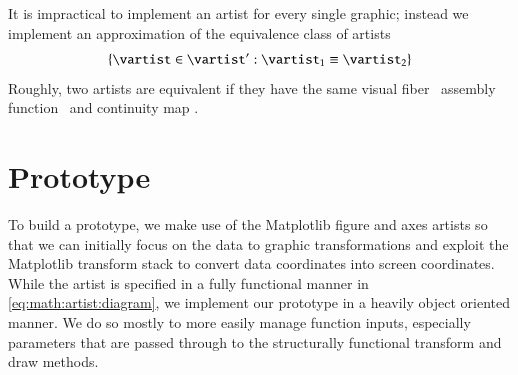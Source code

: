 \documentclass[journal]{vgtc}                %
\begin{document}
It is impractical to implement an artist for every single graphic; instead we implement an approximation of the equivalence class of artists 
\begin{equation}
\{\vartist \in \vartist^{\prime}: \vartist_{1} \equiv \vartist_{2}\}
\label{eq:math:artist:aprime}
\end{equation}
Roughly, two artists are equivalent if they have the same visual fiber \vfiber\, assembly function \vmark\, and continuity map \vindex. 

\section{Prototype}
\label{sec:code}
To build a prototype, we make use of the Matplotlib figure and axes artists \cite{hunterArchitectureOpenSource,hunterMatplotlib2DGraphics2007} so that we can initially focus on the data to graphic transformations and exploit the Matplotlib transform stack to convert data coordinates into screen coordinates. While the artist is specified in a fully functional manner in \autoref{eq:math:artist:diagram}, we implement our prototype in a heavily object oriented manner. We do so mostly to more easily manage function inputs, especially parameters that are passed through to the structurally functional transform and draw methods. 
\end{document}
